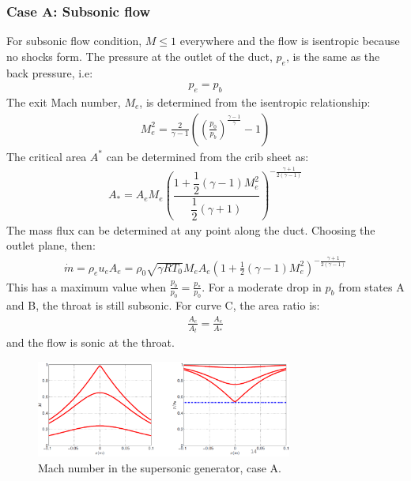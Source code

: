 \subsubsection{Case A: Subsonic flow}
For subsonic flow condition, $M \leq 1$ everywhere and the flow is isentropic because no shocks form. The pressure at the outlet of the duct, $p_e$, is the same as the back pressure, i.e:
\begin{gather}
    p_e = p_b
\end{gather}
The exit Mach number, $M_e$, is determined from the isentropic relationship:
\begin{gather}
    M_e^2 = \frac{2}{\gamma - 1}\left(\left(\frac{p_0}{p_b}\right)^{\frac{\gamma - 1}{\gamma}}-1\right)
\end{gather}
The critical area $A^*$ can be determined from the crib sheet as:
\begin{gather}
    A_* = A_e M_e \left(\dfrac{1 + \dfrac{1}{2}\left(\gamma - 1\right)M^2_e}{\dfrac{1}{2}\left(\gamma + 1\right)}\right)^{-\frac{\gamma + 1}{2\left(\gamma -1\right)}}
\end{gather}
The mass flux can be determined at any point along the duct. Choosing the outlet plane, then:
\begin{gather}
    \dot{m} = \rho_e u_e A_e = \rho_0 \sqrt{\gamma RT_0}M_e A_e \left(1 + \frac{1}{2}\left(\gamma - 1\right)M^2_e\right)^{-\frac{\gamma + 1}{2\left(\gamma - 1\right)}}
\end{gather}
This has a maximum value when $\frac{p_b}{p_0} = \frac{p_*}{p_0}$. For a moderate drop in $p_b$ from states A and B, the throat is still subsonic. For curve C, the area ratio is:
\begin{gather}
    \frac{A_e}{A_t} = \frac{A_e}{A_*}
\end{gather}
and the flow is sonic at the throat.
\begin{figure}[H]
    \centering
    \includegraphics[width = 0.75\textwidth]{./img/diagram57.png}
    \caption{Mach number in the supersonic generator, case A.}
\end{figure}
